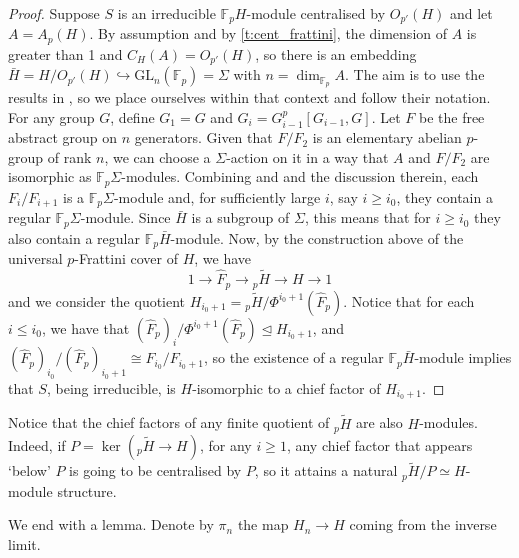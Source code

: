 \documentclass[a4paper,10pt]{amsart}
\theoremstyle{plain}
\theoremstyle{definition}
\begin{document}
\begin{proof} 
    Suppose $S$ is an irreducible $\mathbb F_pH$-module centralised by $O_{p'}(H)$ and let $A=A_p(H)$. By assumption and by \cref{t:cent_frattini}, the dimension of $A$ is greater than 1 and $C_H(A)=O_{p'}(H)$, so there is an embedding $\bar{H}=H/O_{p'}(H) \hookrightarrow \mathrm{GL}_n(\mathbb F_p)=\Sigma$ with $n=\dim_{\mathbb F_p}A$. The aim is to use the results in \cite{BK}, so we place ourselves within that context and follow their notation. For any group $G$, define $G_1 = G$ and $G_i = G_{i-1}^p[G_{i-1},G]$. Let $F$ be the free abstract group on $n$ generators. Given that $F/F_2$ is an elementary abelian $p$-group of rank $n$, we can choose a $\Sigma$-action on it in a way that $A$ and $F/F_2$ are isomorphic as $\mathbb F_p\Sigma$-modules. Combining \cite[Theorem 2]{BK} and \cite[Theorem 3]{BK} and the discussion therein, each $F_i/F_{i+1}$ is a $\mathbb F_p\Sigma$-module and, for sufficiently large $i$, say $i \geq i_0$, they contain a regular $\mathbb F_p \Sigma$-module. Since $\bar{H}$ is a subgroup of $\Sigma$, this means that for $i \geq i_0$ they also contain a regular $\mathbb F_p\bar{H}$-module. Now, by the construction above of the universal $p$-Frattini cover of $H$, we have
    \[1 \rightarrow \widehat{F}_p \rightarrow {}_p\widetilde H \rightarrow H \rightarrow 1\]
    and we consider the quotient $H_{i_0+1} = {}_p\widetilde H/\Phi^{i_0+1}(\widehat F_p)$. Notice that for each $i\leq i_0$, we have that $(\widehat{F}_p)_{i}/\Phi^{i_0+1}(\widehat{F}_p) \unlhd H_{i_0+1}$, and $(\widehat F_p)_{i_0}/(\widehat{F}_p)_{i_0+1} \cong F_{i_0}/F_{i_0+1}$, so the existence of a regular $\mathbb F_p \bar{H}$-module implies that $S$, being irreducible, is $H$-isomorphic to a chief factor of $H_{i_0+1}$.
\end{proof}

Notice that the chief factors of any finite quotient of ${}_p\widetilde H$ are also $H$-modules. Indeed, if $P = \ker ({}_p\widetilde H \to H)$, for any $i\geq 1$, any chief factor that appears `below' $P$ is going to be centralised by $P$, so it attains a natural ${}_p\widetilde H/P \simeq H$-module structure.

We end with a lemma. Denote by $\pi_n$ the map $H_n \to H$ coming from the inverse limit.
\end{document}
